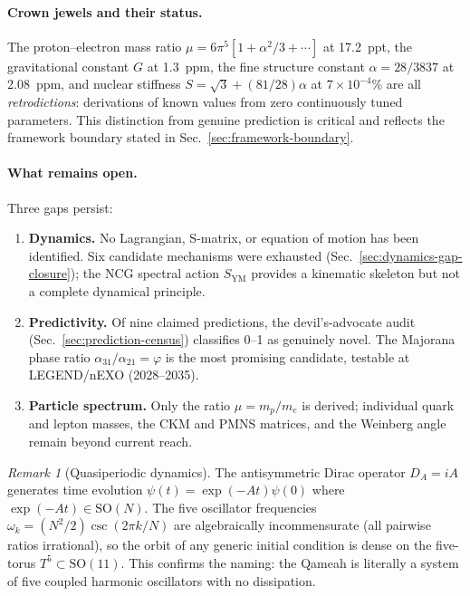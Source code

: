 \documentclass[aps,prd,twocolumn,superscriptaddress,floatfix,nofootinbib]{revtex4-2}
\theoremstyle{definition}
\theoremstyle{remark}
\newtheorem{remark}[theorem]{Remark}
\begin{document}
\paragraph{Crown jewels and their status.}
The proton--electron mass ratio $\mu = 6\pi^5[1+\alpha^2/3+\cdots]$ at 17.2~ppt,
the gravitational constant $G$ at 1.3~ppm, the fine structure constant
$\alpha = 28/3837$ at 2.08~ppm, and nuclear stiffness $S = \sqrt{3}+(81/28)\alpha$
at $7\times 10^{-4}\%$ are all \emph{retrodictions}: derivations of known values
from zero continuously tuned parameters.  This distinction from genuine prediction
is critical and reflects the framework boundary stated in
Sec.~\ref{sec:framework-boundary}.

\paragraph{What remains open.}
Three gaps persist:
\begin{enumerate}
  \item \textbf{Dynamics.} No Lagrangian, S-matrix, or equation of motion has been
    identified.  Six candidate mechanisms were exhausted
    (Sec.~\ref{sec:dynamics-gap-closure}); the NCG spectral action
    $S_{\mathrm{YM}}$ provides a kinematic skeleton but not a complete dynamical
    principle.
  \item \textbf{Predictivity.} Of nine claimed predictions, the devil's-advocate
    audit (Sec.~\ref{sec:prediction-census}) classifies 0--1 as genuinely novel.
    The Majorana phase ratio $\alpha_{31}/\alpha_{21} = \varphi$ is the most
    promising candidate, testable at LEGEND/nEXO (2028--2035).
  \item \textbf{Particle spectrum.} Only the ratio $\mu = m_p/m_e$ is derived;
    individual quark and lepton masses, the CKM and PMNS matrices, and the
    Weinberg angle remain beyond current reach.
\end{enumerate}

\begin{remark}[Quasiperiodic dynamics]
The antisymmetric Dirac operator $D_A = iA$ generates time evolution
$\psi(t) = \exp(-At)\psi(0)$ where $\exp(-At) \in \mathrm{SO}(N)$.
The five oscillator frequencies $\omega_k = (N^2/2)\csc(2\pi k/N)$
are algebraically incommensurate (all pairwise ratios irrational),
so the orbit of any generic initial condition is dense on the
five-torus $T^5 \subset \mathrm{SO}(11)$.
This confirms the naming: the Qameah is literally a system of
five coupled harmonic oscillators with no dissipation.
\end{remark}
\end{document}
